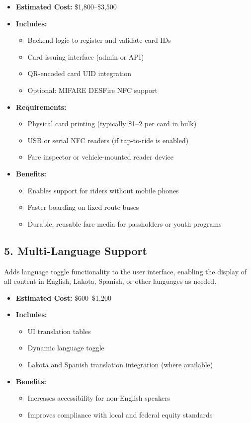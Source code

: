 \documentclass[12pt]{article}
\begin{document}
\begin{itemize}
    \item \textbf{Estimated Cost:} \$1,800–\$3,500
    \item \textbf{Includes:}
    \begin{itemize}
        \item Backend logic to register and validate card IDs
        \item Card issuing interface (admin or API)
        \item QR-encoded card UID integration
        \item Optional: MIFARE DESFire NFC support
    \end{itemize}
    \item \textbf{Requirements:}
    \begin{itemize}
        \item Physical card printing (typically \$1–2 per card in bulk)
        \item USB or serial NFC readers (if tap-to-ride is enabled)
        \item Fare inspector or vehicle-mounted reader device
    \end{itemize}
    \item \textbf{Benefits:}
    \begin{itemize}
        \item Enables support for riders without mobile phones
        \item Faster boarding on fixed-route buses
        \item Durable, reusable fare media for passholders or youth programs
    \end{itemize}
\end{itemize}

\subsection*{5. Multi-Language Support}

Adds language toggle functionality to the user interface, enabling the display of all content in English, Lakota, Spanish, or other languages as needed.

\begin{itemize}
    \item \textbf{Estimated Cost:} \$600–\$1,200
    \item \textbf{Includes:}
    \begin{itemize}
        \item UI translation tables
        \item Dynamic language toggle
        \item Lakota and Spanish translation integration (where available)
    \end{itemize}
    \item \textbf{Benefits:}
    \begin{itemize}
        \item Increases accessibility for non-English speakers
        \item Improves compliance with local and federal equity standards
    \end{itemize}
\end{itemize}
\end{document}
